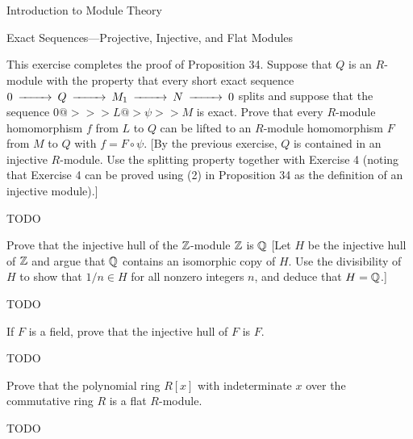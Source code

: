 \begin{chapter}{Introduction to Module Theory}
\begin{section}{Exact Sequences---Projective, Injective, and Flat Modules}
\begin{problem}\label{ex:10.5.17}
This exercise completes the proof of Proposition 34. Suppose that $Q$ is an $R$-module with the property that every short exact sequence $\begin{CD}0@>>>Q@>>>M_1@>>>N@>>>0\end{CD}$ splits and suppose that the sequence $0@>>>L@>\psi>>M$ is exact. Prove that every $R$-module homomorphism $f$ from $L$ to $Q$ can be lifted to an $R$-module homomorphism $F$ from $M$ to $Q$ with $f=F\circ\psi$. [By the previous exercise, $Q$ is contained in an injective $R$-module. Use the splitting property together with Exercise 4 (noting that Exercise 4 can be proved using (2) in Proposition 34 as the definition of an injective module).] 
\end{problem}
\begin{solution}TODO

\end{solution}\oneperpage



\begin{problem}\label{ex:10.5.18}
Prove that the injective hull of the $\mathbb{Z}$-module $\mathbb{Z}$ is $\mathbb{Q}$ [Let $H$ be the injective hull of $\mathbb{Z}$ and argue that $\mathbb{Q}$ contains an isomorphic copy of $H$. Use the divisibility of $H$ to show that $1/n\in H$ for all nonzero integers $n$, and deduce that $H=\mathbb{Q}$.]
\end{problem}
\begin{solution}TODO

\end{solution}\oneperpage



\begin{problem}\label{ex:10.5.19}
If $F$ is a field, prove that the injective hull of $F$ is $F$.
\end{problem}
\begin{solution}TODO

\end{solution}\oneperpage



\begin{problem}\label{ex:10.5.20}
Prove that the polynomial ring $R[x]$ with indeterminate $x$ over the commutative ring $R$ is a flat $R$-module.
\end{problem}
\begin{solution}TODO

\end{solution}\oneperpage




\end{section}
\end{chapter}
